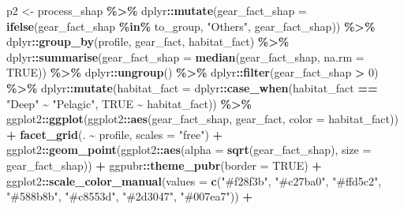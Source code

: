 \documentclass[
]{book}
\newenvironment{Shaded}{\begin{snugshade}}{\end{snugshade}}
\newcommand{\AttributeTok}[1]{\textcolor[rgb]{0.13,0.29,0.53}{#1}}
\newcommand{\ConstantTok}[1]{\textcolor[rgb]{0.56,0.35,0.01}{#1}}
\newcommand{\DecValTok}[1]{\textcolor[rgb]{0.00,0.00,0.81}{#1}}
\newcommand{\FunctionTok}[1]{\textcolor[rgb]{0.13,0.29,0.53}{\textbf{#1}}}
\newcommand{\NormalTok}[1]{#1}
\newcommand{\OtherTok}[1]{\textcolor[rgb]{0.56,0.35,0.01}{#1}}
\newcommand{\SpecialCharTok}[1]{\textcolor[rgb]{0.81,0.36,0.00}{\textbf{#1}}}
\newcommand{\StringTok}[1]{\textcolor[rgb]{0.31,0.60,0.02}{#1}}
\begin{document}
\begin{Shaded}
\begin{Highlighting}[]
\NormalTok{p2 }\OtherTok{\textless{}{-}}
\NormalTok{  process\_shap }\SpecialCharTok{\%\textgreater{}\%}
\NormalTok{  dplyr}\SpecialCharTok{::}\FunctionTok{mutate}\NormalTok{(}\AttributeTok{gear\_fact\_shap =} \FunctionTok{ifelse}\NormalTok{(gear\_fact\_shap }\SpecialCharTok{\%in\%}\NormalTok{ to\_group, }\StringTok{"Others"}\NormalTok{, gear\_fact\_shap)) }\SpecialCharTok{\%\textgreater{}\%}
\NormalTok{  dplyr}\SpecialCharTok{::}\FunctionTok{group\_by}\NormalTok{(profile, gear\_fact, habitat\_fact) }\SpecialCharTok{\%\textgreater{}\%}
\NormalTok{  dplyr}\SpecialCharTok{::}\FunctionTok{summarise}\NormalTok{(}\AttributeTok{gear\_fact\_shap =} \FunctionTok{median}\NormalTok{(gear\_fact\_shap, }\AttributeTok{na.rm =} \ConstantTok{TRUE}\NormalTok{)) }\SpecialCharTok{\%\textgreater{}\%}
\NormalTok{  dplyr}\SpecialCharTok{::}\FunctionTok{ungroup}\NormalTok{() }\SpecialCharTok{\%\textgreater{}\%}
\NormalTok{  dplyr}\SpecialCharTok{::}\FunctionTok{filter}\NormalTok{(gear\_fact\_shap }\SpecialCharTok{\textgreater{}} \DecValTok{0}\NormalTok{) }\SpecialCharTok{\%\textgreater{}\%}
\NormalTok{  dplyr}\SpecialCharTok{::}\FunctionTok{mutate}\NormalTok{(}\AttributeTok{habitat\_fact =}\NormalTok{ dplyr}\SpecialCharTok{::}\FunctionTok{case\_when}\NormalTok{(habitat\_fact }\SpecialCharTok{==} \StringTok{"Deep"} \SpecialCharTok{\textasciitilde{}} \StringTok{"Pelagic"}\NormalTok{, }\ConstantTok{TRUE} \SpecialCharTok{\textasciitilde{}}\NormalTok{ habitat\_fact)) }\SpecialCharTok{\%\textgreater{}\%}
\NormalTok{  ggplot2}\SpecialCharTok{::}\FunctionTok{ggplot}\NormalTok{(ggplot2}\SpecialCharTok{::}\FunctionTok{aes}\NormalTok{(gear\_fact\_shap, gear\_fact, }\AttributeTok{color =}\NormalTok{ habitat\_fact)) }\SpecialCharTok{+}
  \FunctionTok{facet\_grid}\NormalTok{(. }\SpecialCharTok{\textasciitilde{}}\NormalTok{ profile, }\AttributeTok{scales =} \StringTok{"free"}\NormalTok{) }\SpecialCharTok{+}
\NormalTok{  ggplot2}\SpecialCharTok{::}\FunctionTok{geom\_point}\NormalTok{(ggplot2}\SpecialCharTok{::}\FunctionTok{aes}\NormalTok{(}\AttributeTok{alpha =} \FunctionTok{sqrt}\NormalTok{(gear\_fact\_shap), }\AttributeTok{size =}\NormalTok{ gear\_fact\_shap)) }\SpecialCharTok{+}
\NormalTok{  ggpubr}\SpecialCharTok{::}\FunctionTok{theme\_pubr}\NormalTok{(}\AttributeTok{border =} \ConstantTok{TRUE}\NormalTok{) }\SpecialCharTok{+}
\NormalTok{  ggplot2}\SpecialCharTok{::}\FunctionTok{scale\_color\_manual}\NormalTok{(}\AttributeTok{values =} \FunctionTok{c}\NormalTok{(}\StringTok{"\#f28f3b"}\NormalTok{, }\StringTok{"\#c27ba0"}\NormalTok{, }\StringTok{"\#ffd5c2"}\NormalTok{, }\StringTok{"\#588b8b"}\NormalTok{, }\StringTok{"\#c8553d"}\NormalTok{, }\StringTok{"\#2d3047"}\NormalTok{, }\StringTok{"\#007ea7"}\NormalTok{)) }\SpecialCharTok{+}

\end{Highlighting}
\end{Shaded}
\end{document}
